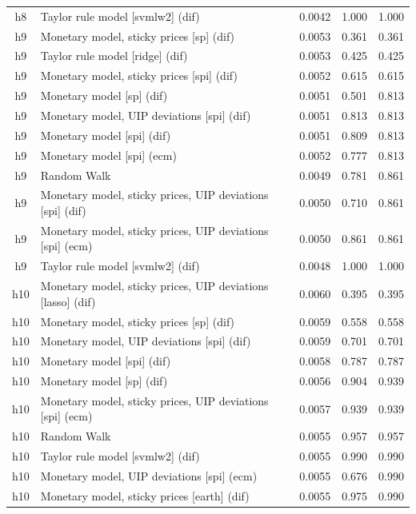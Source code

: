 \begin{ThreePartTable}
\begin{longtable}[t]{cp{5.5cm}ccc}
h8 & \raggedright Taylor rule model [svmlw2] (dif) & 0.0042 & 1.000 & 1.000\\
\addlinespace
h9 & \raggedright Monetary model, sticky prices [sp] (dif) & 0.0053 & 0.361 & 0.361\\
h9 & \raggedright Taylor rule model [ridge] (dif) & 0.0053 & 0.425 & 0.425\\
h9 & \raggedright Monetary model, sticky prices [spi] (dif) & 0.0052 & 0.615 & 0.615\\
h9 & \raggedright Monetary model [sp] (dif) & 0.0051 & 0.501 & 0.813\\
h9 & \raggedright Monetary model, UIP deviations [spi] (dif) & 0.0051 & 0.813 & 0.813\\
h9 & \raggedright Monetary model [spi] (dif) & 0.0051 & 0.809 & 0.813\\
h9 & \raggedright Monetary model [spi] (ecm) & 0.0052 & 0.777 & 0.813\\
h9 & \raggedright Random Walk & 0.0049 & 0.781 & 0.861\\
h9 & \raggedright Monetary model, sticky prices, UIP deviations [spi] (dif) & 0.0050 & 0.710 & 0.861\\
h9 & \raggedright Monetary model, sticky prices, UIP deviations [spi] (ecm) & 0.0050 & 0.861 & 0.861\\
h9 & \raggedright Taylor rule model [svmlw2] (dif) & 0.0048 & 1.000 & 1.000\\
\addlinespace
h10 & \raggedright Monetary model, sticky prices, UIP deviations [lasso] (dif) & 0.0060 & 0.395 & 0.395\\
h10 & \raggedright Monetary model, sticky prices [sp] (dif) & 0.0059 & 0.558 & 0.558\\
h10 & \raggedright Monetary model, UIP deviations [spi] (dif) & 0.0059 & 0.701 & 0.701\\
h10 & \raggedright Monetary model [spi] (dif) & 0.0058 & 0.787 & 0.787\\
h10 & \raggedright Monetary model [sp] (dif) & 0.0056 & 0.904 & 0.939\\
h10 & \raggedright Monetary model, sticky prices, UIP deviations [spi] (ecm) & 0.0057 & 0.939 & 0.939\\
h10 & \raggedright Random Walk & 0.0055 & 0.957 & 0.957\\
h10 & \raggedright Taylor rule model [svmlw2] (dif) & 0.0055 & 0.990 & 0.990\\
h10 & \raggedright Monetary model, UIP deviations [spi] (ecm) & 0.0055 & 0.676 & 0.990\\
h10 & \raggedright Monetary model, sticky prices [earth] (dif) & 0.0055 & 0.975 & 0.990\\

\end{longtable}
\end{ThreePartTable}
